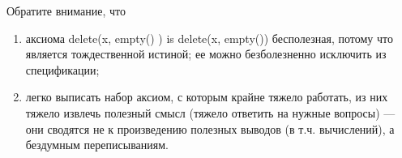 Обратите внимание, что
\begin{enumerate}
  \item аксиома delete(x, empty() ) is delete(x, empty()) бесполезная, потому что является тождественной истиной; ее можно безболезненно исключить из спецификации;
  \item легко выписать набор аксиом, с которым крайне тяжело работать, из них тяжело извлечь полезный смысл (тяжело ответить на нужные вопросы) --- они сводятся не к произведению полезных выводов (в т.ч. вычислений), а бездумным переписываниям.
\end{enumerate}

